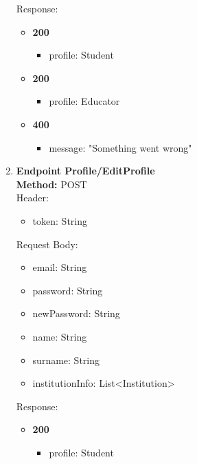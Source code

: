 \begin{enumerate}
    Response:\\
    \begin{itemize}
        \item \textbf{200} \\
        \begin{itemize}
            \item profile: Student
        \end{itemize}
        \item \textbf{200} \\
        \begin{itemize}
            \item profile: Educator
        \end{itemize}
        \item \textbf{400} \\
        \begin{itemize}
            \item message: "Something went wrong"
        \end{itemize}
    \end{itemize}
    \item \textbf{Endpoint Profile/EditProfile} \\
    \textbf{Method:} POST \\
    Header:\\
    \begin{itemize}
        \item token: String
    \end{itemize}
    Request Body: \\
    \begin{itemize}
        \item email: String
        \item password: String
        \item newPassword: String
        \item name: String
        \item surname: String
        \item institutionInfo: List<Institution>
    \end{itemize}
    Response:\\
    \begin{itemize}
        \item \textbf{200} \\
        \begin{itemize}
            \item profile: Student
        \end{itemize}

\end{itemize}
\end{enumerate}
